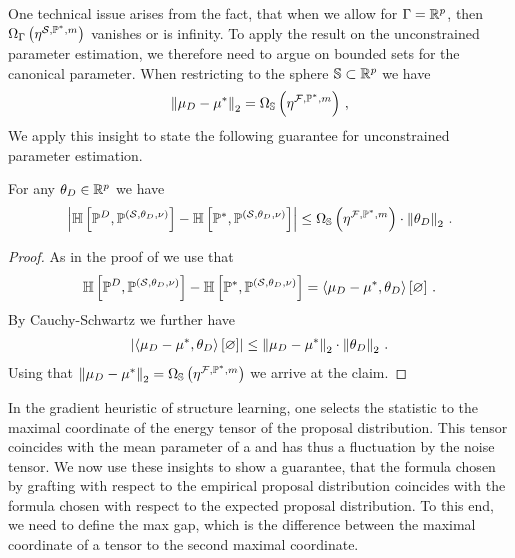 One technical issue arises from the fact, that when we allow for $\Gamma=\mathbb{R}^{p}$, then $\Omega_{\Gamma}\left(\eta^{\mathcal{S},\mathbb{P}^*,m}\right)$ vanishes or is infinity.
To apply the result on the unconstrained parameter estimation, we therefore need to argue on bounded sets for the canonical parameter.
When restricting to the sphere $\mathbb{S}\subset\mathbb{R}^{p}$ we have
\begin{align*}
    \left\|\mu_{D}-\mu^*\right\|_{2} = \Omega_{\mathbb{S}}\left(\eta^{\mathcal{F},\mathbb{P}^*,m}\right) \, ,
\end{align*}
We apply this insight to state the following guarantee for unconstrained parameter estimation.
\begin{theorem}
    \label{the:detGuaranteeUnconstrained}
    For any $\theta_{D}\in\mathbb{R}^{p}$ we have
    \begin{align*}
        \left|\mathbb{H}\left[\mathbb{P}^{D},\mathbb{P}^{(\mathcal{S},\theta_{D},\nu)}\right]-\mathbb{H}\left[\mathbb{P}^*,\mathbb{P}^{(\mathcal{S},\theta_{D},\nu)}\right]\right|
        \leq \Omega_{\mathbb{S}}\left(\eta^{\mathcal{F},\mathbb{P}^*,m}\right) \cdot \left\|\theta_{D}\right\|_{2} \, .
    \end{align*}
\end{theorem}
\begin{proof}
    As in the proof of  we use that
    \begin{align*}
        \mathbb{H}\left[\mathbb{P}^{D},\mathbb{P}^{(\mathcal{S},\theta_{D},\nu)}\right]-\mathbb{H}\left[\mathbb{P}^*,\mathbb{P}^{(\mathcal{S},\theta_{D},\nu)}\right]
        = \left\langle \mu_{D}-\mu^*,\theta_{D}\right\rangle \left[ \varnothing \right]  \, .
    \end{align*}
    By Cauchy-Schwartz we further have
    \begin{align*}
        \left|\left\langle \mu_{D}-\mu^*,\theta_{D}\right\rangle \left[ \varnothing \right]\right| \leq \left\|\mu_{D}-\mu^*\right\|_{2}\cdot\left\|\theta_{D}\right\|_{2} \, .
    \end{align*}
    Using that $\left\|\mu_{D}-\mu^*\right\|_{2}=\Omega_{\mathbb{S}}\left(\eta^{\mathcal{F},\mathbb{P}^*,m}\right)$ we arrive at the claim.
\end{proof}


In the gradient heuristic of structure learning, one selects the statistic to the maximal coordinate of the energy tensor of the proposal distribution.
This tensor coincides with the mean parameter of a \MarkovLogicNetwork{} and has thus a fluctuation by the noise tensor.
We now use these insights to show a guarantee, that the formula chosen by grafting with respect to the empirical proposal distribution coincides with the formula chosen with respect to the expected proposal distribution.
To this end, we need to define the max gap, which is the difference between the maximal coordinate of a tensor to the second maximal coordinate.

